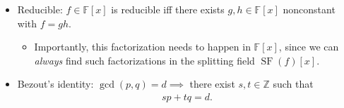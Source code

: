 \begin{concept}

\envlist

\begin{itemize}
\tightlist
\item
  Reducible: \(f\in {\mathbb{F}}[x]\) is reducible iff there exists
  \(g, h\in {\mathbb{F}}[x]\) nonconstant with \(f = g h\).

  \begin{itemize}
  \tightlist
  \item
    Importantly, this factorization needs to happen in
    \({\mathbb{F}}[x]\), since we can \emph{always} find such
    factorizations in the splitting field \(\operatorname{SF}(f)[x]\).
  \end{itemize}
\item
  Bezout's identity: \(\gcd(p, q) = d \implies\) there exist
  \(s,t\in {\mathbb{Z}}\) such that
  \begin{align*}
  sp + tq = d
  .\end{align*}
\end{itemize}

\end{concept}

